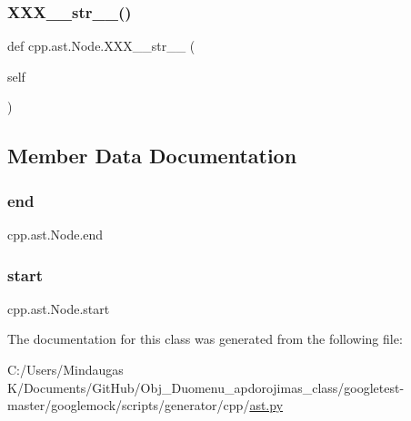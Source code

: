 \subsubsection{\texorpdfstring{XXX\_\_str\_\_()}{XXX\_\_str\_\_()}}
{\footnotesize\ttfamily def cpp.\+ast.\+Node.\+X\+X\+X\+\_\+\+\_\+str\+\_\+\+\_\+ (\begin{DoxyParamCaption}\item[{}]{self }\end{DoxyParamCaption})}



\subsection{Member Data Documentation}
\mbox{\label{classcpp_1_1ast_1_1_node_a3c5e5246ccf619df28eca02e29d69647}} 
\subsubsection{\texorpdfstring{end}{end}}
{\footnotesize\ttfamily cpp.\+ast.\+Node.\+end}

\mbox{\label{classcpp_1_1ast_1_1_node_a7b2aa97e6a049bb1a93aea48c48f1f44}} 
\subsubsection{\texorpdfstring{start}{start}}
{\footnotesize\ttfamily cpp.\+ast.\+Node.\+start}



The documentation for this class was generated from the following file\+:\begin{DoxyCompactItemize}
\item 
C\+:/\+Users/\+Mindaugas K/\+Documents/\+Git\+Hub/\+Obj\+\_\+\+Duomenu\+\_\+apdorojimas\+\_\+class/googletest-\/master/googlemock/scripts/generator/cpp/\mbox{\hyperlink{googletest-master_2googlemock_2scripts_2generator_2cpp_2ast_8py}{ast.\+py}}\end{DoxyCompactItemize}
